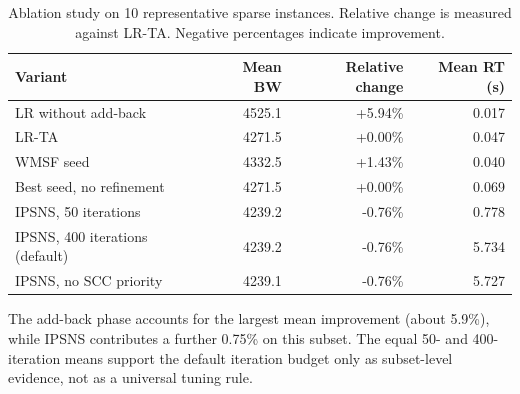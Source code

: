 \begin{table}[t]
\centering
\caption{Ablation study on 10 representative sparse instances. Relative change is measured against LR-TA. Negative percentages indicate improvement.}
\label{tab:ablation}
\begin{tabular}{lrrr}
\toprule
Variant & Mean BW & Relative change & Mean RT (s) \\
\midrule
LR without add-back & 4525.1 & +5.94\% & 0.017 \\
LR-TA & 4271.5 & +0.00\% & 0.047 \\
WMSF seed & 4332.5 & +1.43\% & 0.040 \\
Best seed, no refinement & 4271.5 & +0.00\% & 0.069 \\
IPSNS, 50 iterations & 4239.2 & -0.76\% & 0.778 \\
IPSNS, 400 iterations (default) & 4239.2 & -0.76\% & 5.734 \\
IPSNS, no SCC priority & 4239.1 & -0.76\% & 5.727 \\
\bottomrule
\end{tabular}
\par\vspace{2pt}\parbox{0.94\linewidth}{\footnotesize The add-back phase accounts for the largest mean improvement (about 5.9\%), while IPSNS contributes a further 0.75\% on this subset. The equal 50- and 400-iteration means support the default iteration budget only as subset-level evidence, not as a universal tuning rule.}
\end{table}
